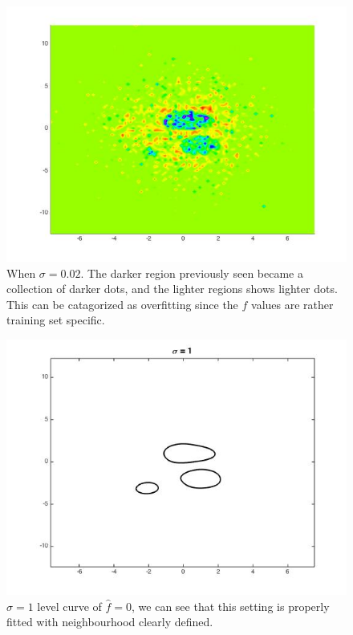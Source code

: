 \documentclass[twoside]{article}
\theoremstyle{definition}
\theoremstyle{definition}
\theoremstyle{remark}
\begin{document}
\begin{figure}[H]
\centering
\includegraphics[width=120mm]{sigma_002.jpg}
\caption{ When $\sigma = 0.02$. The darker region previously seen became a collection of darker dots, and the lighter regions shows lighter dots. This can be catagorized as overfitting since the $f$ values are rather training set specific.\label{problem2Pic5}}
\end{figure}


\begin{figure}[H]
\centering
\includegraphics[width=120mm]{sigma_1_level_curve.jpg}
\caption{ $\sigma = 1$ level curve of $\hat f = 0$, we can see that this setting is properly fitted with neighbourhood clearly defined. \label{problem2Pic6}}
\end{figure}
\end{document}
